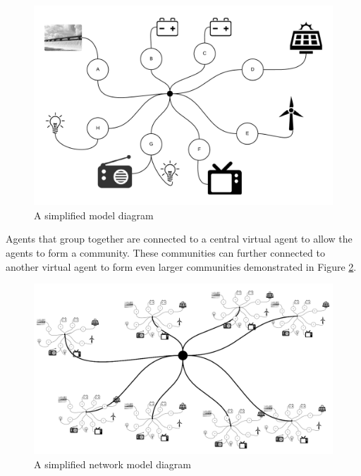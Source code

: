 \clearpage
\begin{figure}[h!]
	\centering
	\includegraphics[scale=0.8]{Images/Model.png}
	\caption{A simplified model diagram}
	\label{fig:SimpleModel}
\end{figure}

Agents that group together are connected to a central virtual agent to allow the agents to form a community. These communities can further connected to another virtual agent to form even larger communities demonstrated in Figure \ref{fig:SimpleModel2}. 

\begin{figure}[h!]
	\centering
	\includegraphics[scale = 0.9]{Images/Model2.png}
	\caption{A simplified network model diagram}
	\label{fig:SimpleModel2}
\end{figure}

